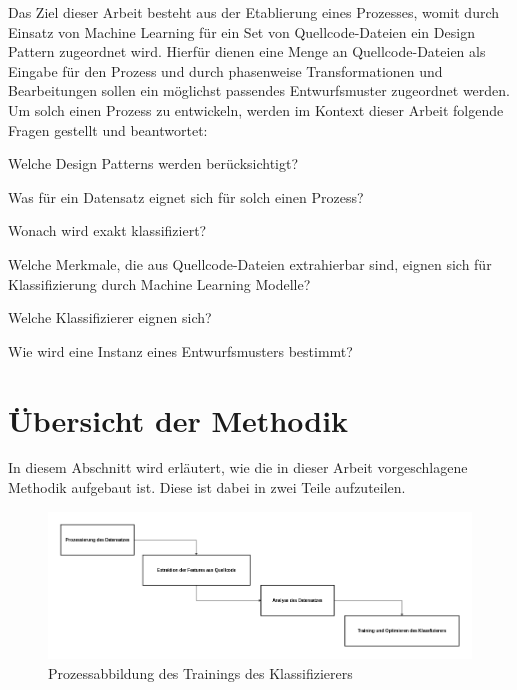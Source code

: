 Das Ziel dieser Arbeit besteht aus der Etablierung eines Prozesses, womit durch Einsatz von Machine Learning für ein Set von Quellcode-Dateien ein Design Pattern zugeordnet wird.
Hierfür dienen eine Menge an Quellcode-Dateien als Eingabe für den Prozess und durch phasenweise Transformationen und Bearbeitungen sollen ein möglichst passendes Entwurfsmuster zugeordnet werden.
Um solch einen Prozess zu entwickeln, werden im Kontext dieser Arbeit folgende Fragen gestellt und beantwortet:

\begin{questions}
    \item\label{RQ1} Welche Design Patterns werden berücksichtigt?
    \item\label{RQ2} Was für ein Datensatz eignet sich für solch einen Prozess?
    \item\label{RQ3} Wonach wird exakt klassifiziert?
    \item\label{RQ4} Welche Merkmale, die aus Quellcode-Dateien extrahierbar sind, eignen sich für Klassifizierung durch Machine Learning Modelle?  
    \item\label{RQ5} Welche Klassifizierer eignen sich?
    \item\label{RQ6} Wie wird eine Instanz eines Entwurfsmusters bestimmt?
\end{questions}


\section{Übersicht der Methodik}

In diesem Abschnitt wird erläutert, wie die in dieser Arbeit vorgeschlagene Methodik aufgebaut ist. 
Diese ist dabei in zwei Teile aufzuteilen.

\begin{figure}[h]
    \centering
    \includegraphics[scale=0.45]{figures/training_overview.png}
    \caption{Prozessabbildung des Trainings des Klassifizierers}
    \label{fig:training_process}
\end{figure}

